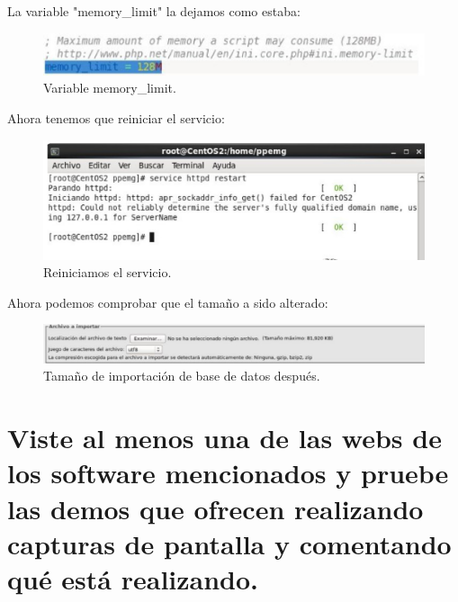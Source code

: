 La variable "memory\_limit" la dejamos como estaba:

\begin{figure}[H]
\begin{center}
\includegraphics[scale=0.4]{Imagenes/sub16-5.eps}
\caption{Variable memory\_limit.}
\end{center}
\end{figure}

Ahora tenemos que reiniciar el servicio:

\begin{figure}[H]
\begin{center}
\includegraphics[scale=0.4]{Imagenes/sub16-6.eps}
\caption{Reiniciamos el servicio.}
\end{center}
\end{figure}

Ahora podemos comprobar que el tamaño a sido alterado:

\begin{figure}[H]
\begin{center}
\includegraphics[scale=0.4]{Imagenes/sub16-7.eps}
\caption{Tamaño de importación de base de datos después.}
\end{center}
\end{figure}

\section{Viste al menos una de las webs de los software mencionados y pruebe las demos que ofrecen realizando capturas de pantalla y comentando qué está realizando.}

